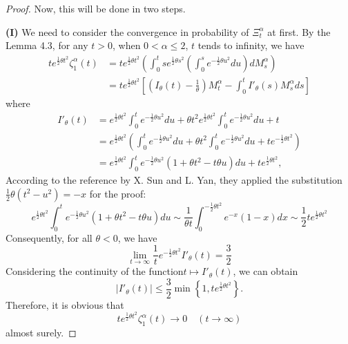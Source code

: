 \documentclass[11pt]{amsart}
\theoremstyle{plain}
\numberwithin{equation}{section}
\begin{document}
\begin{proof}
Now, this will be done in two steps.

\textbf{(I)} We need to consider the convergence in probability of $\Xi_t^\alpha$ at first. By the Lemma 4.3, for any $t>0$, when $0<\alpha\leq 2$, $t$ tends to infinity, we have
\begin{equation*}
\begin{aligned}
te^{\frac{1}{2}\theta t^2}\zeta_1^\alpha(t)&=te^{\frac{1}{2}\theta t^2}\left(\int_0^t se^{\frac{1}{2}\theta s^2}\left(\int_0^s e^{-\frac{1}{2}\theta u^2}du\right)dM_s^\alpha\right)\\
&=te^{\frac{1}{2}\theta t^2}\left[\left(I_\theta(t)-\frac{1}{\theta}\right)M_t^\alpha-\int_0^tI'_\theta(s)M_s^\alpha ds\right]
\end{aligned}
\end{equation*}
where
\begin{equation*}
\begin{aligned}
I'_\theta(t)&=e^{\frac{1}{2}\theta t^2}\int_0^t e^{-\frac{1}{2}\theta u^2}du+\theta t^2e^{\frac{1}{2}\theta t^2}\int_0^t e^{-\frac{1}{2}\theta u^2}du+t\\
&=e^{\frac{1}{2}\theta t^2}\left(\int_0^t e^{-\frac{1}{2}\theta u^2}du+\theta t^2\int_0^t e^{-\frac{1}{2}\theta u^2}du+te^{-\frac{1}{2}\theta t^2}\right)\\
&= e^{\frac{1}{2}\theta t^2}\int_0^t e^{-\frac{1}{2}\theta u^2}(1+\theta t^2-t\theta u)du+te^{\frac{1}{2}\theta t^2},
\end{aligned}
\end{equation*}
According to the reference\cite{Yan2} by X. Sun and L. Yan, they applied the substitution $\frac{1}{2}\theta(t^2-u^2)=-x$ for the proof:
$$
e^{\frac{1}{2}\theta t^2}\int_0^t e^{-\frac{1}{2}\theta u^2}(1+\theta t^2-t\theta u)du \sim \frac{1}{\theta t}\int_0^{-\frac{1}{2}\theta t^2}e^{-x}(1-x)dx \sim \frac{1}{2}te^{\frac{1}{2}\theta t^2}
$$
Consequently, for all $\theta<0$, we have
$$
\lim_{t\rightarrow\infty}\frac{1}{t}e^{-\frac{1}{2}\theta t^2}I'_\theta(t)=\frac{3}{2}
$$
Considering the continuity of the function$t\mapsto I'_\theta(t)$, we can obtain
$$
|I'_\theta(t)|\leq \frac{3}{2} \min\left\{1,te^{\frac{1}{2}\theta t^2}\right\}.
$$
Therefore, it is obvious that
$$
te^{\frac{1}{2}\theta t^2}\zeta_1^\alpha(t)\longrightarrow 0 \quad (t\rightarrow \infty)
$$
almost surely.


\end{proof}
\end{document}
